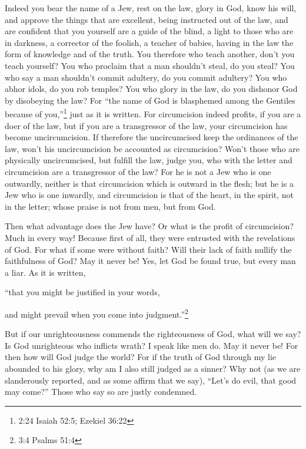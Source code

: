 \myverse{}Indeed you bear the name of a Jew, rest on the law, glory in
God,
\myverse{}know his will, and approve the things that are excellent, being instructed
out of the law,
\myverse{}and are confident that you yourself are a guide of the blind, a light to those
who are in darkness,
\myverse{}a corrector of the foolish, a teacher of babies, having in the law the form
of knowledge and of the truth.
\myverse{}You therefore who teach another, don’t you teach yourself? You who proclaim
that a man shouldn’t steal, do you steal?
\myverse{}You who say a man shouldn’t commit adultery, do you commit adultery? You who
abhor idols, do you rob temples?
\myverse{}You who glory in the law, do you dishonor God by disobeying the law?
\myverse{}For “the name of God is blasphemed among the Gentiles because of you,”\footnote{2:24 Isaiah 52:5;
	Ezekiel 36:22} just as it is written.
\myverse{}For circumcision indeed profits, if you are a doer of the law, but if you
are a transgressor of the law, your circumcision has become uncircumcision.
\myverse{}If therefore the uncircumcised keep the ordinances of the law, won’t his uncircumcision
be accounted as circumcision?
\myverse{}Won’t those who are physically uncircumcised, but fulfill the law, judge you,
who with the letter and circumcision are a transgressor of the law?
\myverse{}For he is not a Jew who is one outwardly, neither is that circumcision which
is outward in the flesh;
\myverse{}but he is a Jew who is one inwardly, and circumcision is that of the heart,
in the spirit, not in the letter; whose praise is not from men, but from God.


\mychapter{} \myverse*{}Then what advantage does the Jew have? Or what is the profit of
circumcision?
\myverse{}Much in every way! Because first of all, they were entrusted with the revelations
of God.
\myverse{}For what if some were without faith? Will their lack of faith nullify the faithfulness
of God?
\myverse{}May it never be! Yes, let God be found true, but every man a liar. As it is
written,

“that you might be justified in your words,

and might prevail when you come into judgment.”\footnote{3:4 Psalms 51:4}

\myverse{}But if our unrighteousness commends the righteousness of God, what
will we say? Is God unrighteous who inflicts wrath? I speak like men do.
\myverse{}May it never be! For then how will God judge the world?
\myverse{}For if the truth of God through my lie abounded to his glory, why am I also
still judged as a sinner?
\myverse{}Why not (as we are slanderously reported, and as some affirm that we say), “Let’s
do evil, that good may come?” Those who say so are justly condemned.

